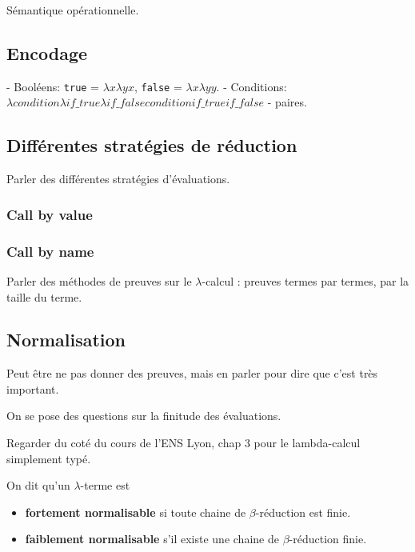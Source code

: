 Sémantique opérationnelle.

\subsection{Encodage}

- Booléens: \verb|true| = $\lambda x \lambda y x$, \verb|false| = $\lambda x
\lambda y y$.
- Conditions: $\lambda condition \lambda if\_true \lambda if\_false condition
if\_true if\_false$
- paires.

\subsection{Différentes stratégies de réduction}

Parler des différentes stratégies d'évaluations.

\subsubsection*{Call by value}
\subsubsection*{Call by name}

Parler des méthodes de preuves sur le $\lambda$-calcul : preuves termes par
termes, par la taille du terme.

\subsection*{Normalisation}

Peut être ne pas donner des preuves, mais en parler pour dire que c'est très important.

On se pose des questions sur la finitude des évaluations.

Regarder du coté du cours de l'ENS Lyon, chap 3 pour le lambda-calcul simplement typé.

\begin{definition}
  On dit qu'un $\lambda$-terme est
  \begin{itemize}
  \item \textbf{fortement normalisable} si
  toute chaine de $\beta$-réduction est finie.
  \item \textbf{faiblement normalisable} s'il existe une chaine de
    $\beta$-réduction finie.
  \end{itemize}
\end{definition}

